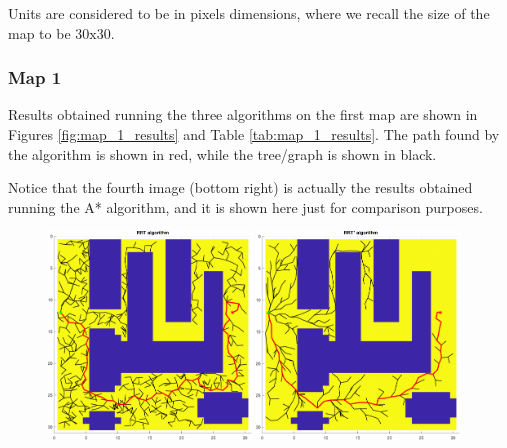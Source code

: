 Units are considered to be in pixels dimensions, where we recall the size of the map to be $30\text{x}30$.


\subsubsection{Map 1}
\label{subsec:map_1}

Results obtained running the three algorithms on the first map are shown in Figures \ref{fig:map_1_results} and Table \ref{tab:map_1_results}.
The path found by the algorithm is shown in red, while the tree/graph is shown in black.

Notice that the fourth image (bottom right) is actually the results obtained running the A* algorithm, and it is shown here just for comparison purposes.

\begin{figure}[H]
    \centering
    \includegraphics[width=0.48\textwidth]{./img/MATLAB/testing/01_RRT.pdf}
    \hspace{6pt}
    \includegraphics[width=0.48\textwidth]{./img/MATLAB/testing/01_RRT Star.pdf}

    \vspace{11pt}


\end{figure}
